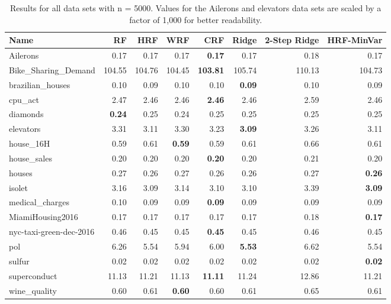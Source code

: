 \begin{table}[ht]
\centering
\begingroup\scriptsize
\begin{tabular}{lrrrrrrr}
  \hline
\textbf{ Name } & \textbf{ RF } & \textbf{ HRF } & \textbf{ WRF } & \textbf{ CRF } & \textbf{ Ridge } & \textbf{ 2-Step Ridge } & \textbf{ HRF-MinVar } \\ 
  \hline
Ailerons & 0.17 & 0.17 & 0.17 & \textbf{0.17} & 0.17 & 0.18 & 0.17 \\ 
  Bike\_Sharing\_Demand & 104.55 & 104.76 & 104.45 & \textbf{103.81} & 105.74 & 110.13 & 104.73 \\ 
  brazilian\_houses & 0.10 & 0.09 & 0.10 & 0.10 & \textbf{0.09} & 0.10 & 0.09 \\ 
  cpu\_act & 2.47 & 2.46 & 2.46 & \textbf{2.46} & 2.46 & 2.59 & 2.46 \\ 
  diamonds & \textbf{0.24} & 0.25 & 0.24 & 0.25 & 0.25 & 0.25 & 0.25 \\ 
  elevators & 3.31 & 3.11 & 3.30 & 3.23 & \textbf{3.09} & 3.26 & 3.11 \\ 
  house\_16H & 0.59 & 0.61 & \textbf{0.59} & 0.59 & 0.61 & 0.66 & 0.61 \\ 
  house\_sales & 0.20 & 0.20 & 0.20 & \textbf{0.20} & 0.20 & 0.21 & 0.20 \\ 
  houses & 0.27 & 0.26 & 0.27 & 0.26 & 0.26 & 0.27 & \textbf{0.26} \\ 
  isolet & 3.16 & 3.09 & 3.14 & 3.10 & 3.10 & 3.39 & \textbf{3.09} \\ 
  medical\_charges & 0.10 & 0.09 & 0.09 & \textbf{0.09} & 0.09 & 0.09 & 0.09 \\ 
  MiamiHousing2016 & 0.17 & 0.17 & 0.17 & 0.17 & 0.17 & 0.18 & \textbf{0.17} \\ 
  nyc-taxi-green-dec-2016 & 0.46 & 0.45 & 0.45 & \textbf{0.45} & 0.45 & 0.46 & 0.45 \\ 
  pol & 6.26 & 5.54 & 5.94 & 6.00 & \textbf{5.53} & 6.62 & 5.54 \\ 
  sulfur & 0.02 & 0.02 & 0.02 & 0.02 & 0.02 & 0.02 & \textbf{0.02} \\ 
  superconduct & 11.13 & 11.21 & 11.13 & \textbf{11.11} & 11.24 & 12.86 & 11.21 \\ 
  wine\_quality & 0.60 & 0.61 & \textbf{0.60} & 0.60 & 0.61 & 0.65 & 0.61 \\ 
   \hline
\end{tabular}
\endgroup
\caption{Results for all data sets with n = 5000. Values for the Ailerons and elevators data sets are scaled by a factor of 1,000 for better readability.} 
\end{table}
